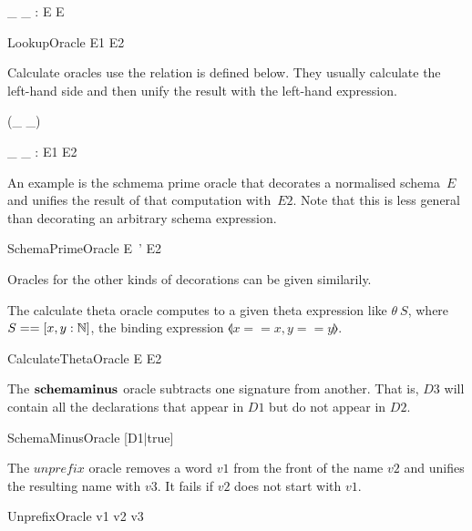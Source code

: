 \documentclass{entcs}
\newcommand{\unprefix}{\mathrel{unprefix}}
\begin{document}
\begin{gendef}[E]
  \_ \hasDefn \_ : E \rel E
\end{gendef}

\begin{zedproviso}{LookupOracle}
  E1 \hasDefn E2
\end{zedproviso}

Calculate oracles use the relation is defined below.  They usually
calculate the left-hand side and then unify the result with the
left-hand expression.

\begin{zed}
  \relation (\_ \is \_)
\end{zed}

\begin{gendef}[E1,E2]
  \_ \is \_ : E1 \rel E2
\end{gendef}

An example is the schmema prime oracle that decorates a normalised
schema~$E$ and unifies the result of that computation with~$E2$.  Note
that this is less general than decorating an arbitrary schema
expression.

\begin{zedproviso}{SchemaPrimeOracle}
  E~' \is E2
\end{zedproviso}

Oracles for the other kinds of decorations can be given similarily.

The calculate theta oracle computes to a given theta expression like
$\theta~S$, where $S==[x,y:{\mathbb N}]$, the binding expression $\lblot
x==x,y==y \rblot$.

\begin{zedproviso}{CalculateThetaOracle}
  \theta E \is E2
\end{zedproviso}

The $\mathbin{\textbf{schemaminus}}$ oracle subtracts one signature from another.  That
is, $D3$ will contain all the declarations that appear in $D1$ but do
not appear in $D2$.

\begin{zedproviso}{SchemaMinusOracle}
  [D1|true] \schemaminus [D2|true] \is [D3|true]
\end{zedproviso}

The $\unprefix$ oracle removes a word $v1$ from the front of the name
$v2$ and unifies the resulting name with $v3$.  It fails if $v2$ does
not start with $v1$.

\begin{zedproviso}{UnprefixOracle}
  v1 \unprefix v2 \is v3
\end{zedproviso}
\end{document}
